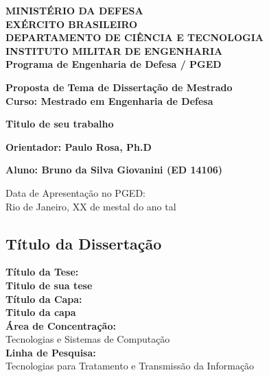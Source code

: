 \documentclass[a4paper, 12pt]{article}
\author{Seu nome}
\title{}
\begin{document}
\begin{center}
\textbf{MINISTÉRIO DA DEFESA}\\
\textbf{EXÉRCITO BRASILEIRO}\\
\textbf{DEPARTAMENTO DE CIÊNCIA E TECNOLOGIA}\\
\textbf{INSTITUTO MILITAR DE ENGENHARIA}\\
\textbf{Programa de Engenharia de Defesa / PGED}

\vspace{2.5cm}

\begin{large}
\textbf{Proposta de Tema de Dissertação de Mestrado
\\Curso: Mestrado em Engenharia de Defesa}

\vspace{1.5cm}

\textbf{Titulo de seu trabalho}

\vspace{1.5cm}


\textbf{Orientador: Paulo Rosa, Ph.D}

\end{large}

\vspace{1.5cm}

\textbf{Aluno: Bruno da Silva Giovanini (ED 14106)}


\vspace{2cm}

\begin{small}
Data de Apresentação no PGED:\\
Rio de Janeiro, XX de mestal do ano tal
\end{small}

\end{center}


\newpage
\begin{large}
\section{Título da Dissertação}
\textbf{Título da Tese:}\\
\textbf{Titulo de sua tese}\\

\noindent\textbf{Título da Capa:}\\
\textbf{Titulo da capa}\\

\noindent\textbf{Área de Concentração:}\\
Tecnologias e Sistemas de Computação\\

\noindent\textbf{Linha de Pesquisa:}\\
Tecnologias para Tratamento e Transmissão da Informação\\
\end{large}
\end{document}
